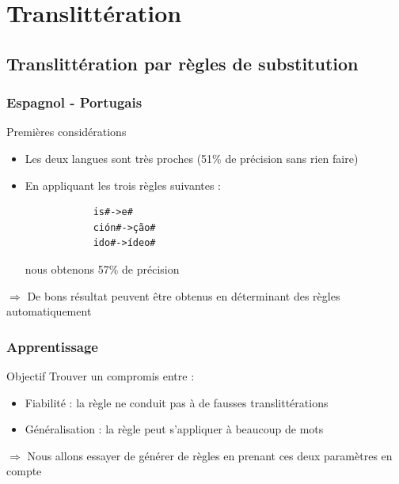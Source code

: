 \documentclass{beamer}
\begin{document}
\section{Translittération}


\begin{frame}
\end{frame}



\subsection{Translittération par règles de substitution}

\begin{frame}[fragile]
	\frametitle{Espagnol - Portugais}

	\begin{block}{Premières considérations}
		\begin{itemize}
		\item Les deux langues sont très proches (51\% de précision sans rien faire)
		\item En appliquant les trois règles suivantes : {\scriptsize \begin{verbatim}
			is#->e#
			ción#->ção#
			ido#->ídeo#
			\end{verbatim}}
			nous obtenons 57\% de précision
		\end{itemize}
	\end{block}

	\begin{alertblock}{}
	$\Longrightarrow$ De bons résultat peuvent être obtenus en déterminant des règles automatiquement 
	\end{alertblock}
\end{frame}

\begin{frame}
	\frametitle{Apprentissage}

	\begin{block}{Objectif}
	Trouver un compromis entre :
		\begin{itemize}
		\item Fiabilité : la règle ne conduit pas à de fausses translittérations
		\item Généralisation : la règle peut s'appliquer à beaucoup de mots
		\end{itemize}			
	\end{block}

	\begin{alertblock}{}
	$\Longrightarrow$ Nous allons essayer de générer de règles en prenant ces deux paramètres en compte
	\end{alertblock}
\end{frame}
\end{document}
